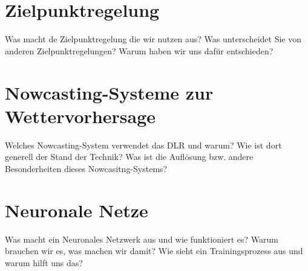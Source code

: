 \section{Zielpunktregelung} \label{sec_Zielpunktregelung}
Was macht de Zielpunktregelung die wir nutzen aus?
Was unterscheidet Sie von anderen Zielpunktregelungen?
Warum haben wir uns dafür entschieden?

\section{Nowcasting-Systeme zur Wettervorhersage} \label{sec_Nowcasting}
Welches Nowcasting-System verwendet das DLR und warum?
Wie ist dort generell der Stand der Technik?
Was ist die Auflösung bzw. andere Besonderheiten dieses Nowcasitng-Systems?

\section{Neuronale Netze} \label{sec_NN}
Was macht ein Neuronales Netzwerk aus und wie funktioniert es?
Warum brauchen wir es, was machen wir damit?
Wie sieht ein Trainingsprozess aus und warum hilft uns das?